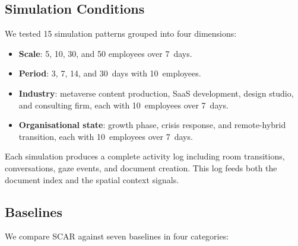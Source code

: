 \documentclass[journal]{IEEEtran}
\begin{document}
\subsection{Simulation Conditions}
\label{subsec:simulation}

We tested 15 simulation patterns grouped into four dimensions:

\begin{itemize}
  \item \textbf{Scale}: 5, 10, 30, and 50 employees over 7~days.
  \item \textbf{Period}: 3, 7, 14, and 30~days with 10~employees.
  \item \textbf{Industry}: metaverse content production, SaaS development, design studio, and consulting firm, each with 10~employees over 7~days.
  \item \textbf{Organisational state}: growth phase, crisis response, and remote-hybrid transition, each with 10~employees over 7~days.
\end{itemize}

Each simulation produces a complete activity log including room transitions, conversations, gaze events, and document creation. This log feeds both the document index and the spatial context signals.

\subsection{Baselines}
\label{subsec:baselines}

We compare SCAR against seven baselines in four categories:
\end{document}
